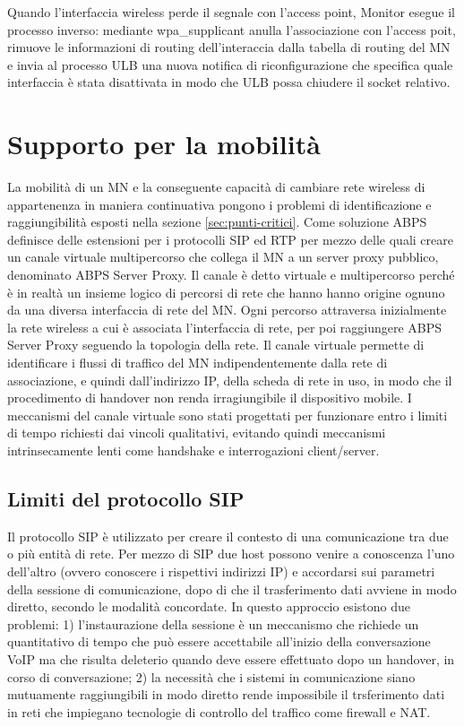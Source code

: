 \documentclass[12pt,a4paper,openright,twoside]{book}
\begin{document}
Quando l'interfaccia wireless perde il segnale con l'access point,
Monitor esegue il processo inverso: mediante wpa\_supplicant anulla
l'associazione con l'access poit, rimuove le informazioni di routing
dell'interaccia dalla tabella di routing del MN e invia al processo
ULB una nuova notifica di riconfigurazione che specifica quale
interfaccia è stata disattivata in modo che ULB possa chiudere il
socket relativo.

\section{Supporto per la mobilità}

La mobilità di un MN e la conseguente capacità di cambiare rete
wireless di appartenenza in maniera continuativa pongono i problemi di
identificazione e raggiungibilità esposti nella sezione
\ref{sec:punti-critici}. Come soluzione ABPS definisce delle
estensioni per i protocolli SIP ed RTP per mezzo delle quali creare un
canale virtuale multipercorso che collega il MN a un server proxy
pubblico, denominato ABPS Server Proxy. Il canale è detto virtuale e
multipercorso perché è in realtà un insieme logico di percorsi di rete
che hanno hanno origine ognuno da una diversa interfaccia di rete del
MN. Ogni percorso attraversa inizialmente la rete wireless a cui è
associata l'interfaccia di rete, per poi raggiungere ABPS Server Proxy
seguendo la topologia della rete. Il canale virtuale permette di
identificare i flussi di traffico del MN indipendentemente dalla rete
di associazione, e quindi dall'indirizzo IP, della scheda di rete in
uso, in modo che il procedimento di handover non renda irragiungibile
il dispositivo mobile. I meccanismi del canale virtuale sono stati
progettati per funzionare entro i limiti di tempo richiesti dai
vincoli qualitativi, evitando quindi meccanismi intrinsecamente lenti
come handshake e interrogazioni client/server.

\subsection{Limiti del protocollo SIP}

Il protocollo SIP è utilizzato per creare il contesto di una
comunicazione tra due o più entità di rete. Per mezzo di SIP due host
possono venire a conoscenza l'uno dell'altro (ovvero conoscere i
rispettivi indirizzi IP) e accordarsi sui parametri della sessione di
comunicazione, dopo di che il trasferimento dati avviene in modo
diretto, secondo le modalità concordate. In questo approccio esistono
due problemi: 1) l'instaurazione della sessione è un meccanismo che
richiede un quantitativo di tempo che può essere accettabile
all'inizio della conversazione VoIP ma che risulta deleterio quando
deve essere effettuato dopo un handover, in corso di conversazione; 2)
la necessità che i sistemi in comunicazione siano mutuamente
raggiungibili in modo diretto rende impossibile il trsferimento dati
in reti che impiegano tecnologie di controllo del traffico come
firewall e NAT.
\end{document}
